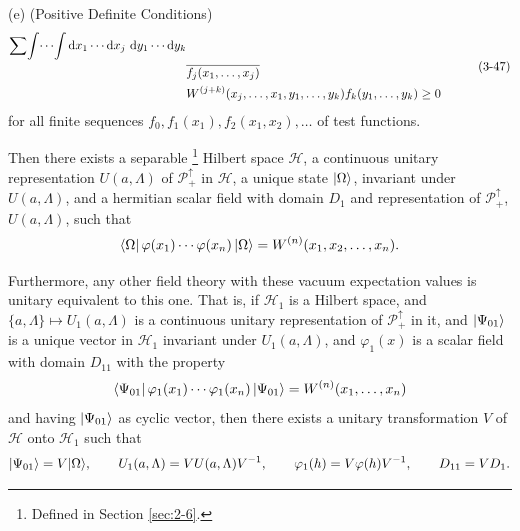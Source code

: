 \begin{theorem}[3-7]
\textup{(e) (Positive Definite Conditions)}
\begin{equation}
\begin{aligned}
\sum\!\int\!\cdots\!\int
 \mathop{}\!\mathrm{d} x_1\cdots\mathop{}\!\mathrm{d} x_j\,\mathop{}\!\mathrm{d} y_1\cdots\mathop{}\!\mathrm{d} y_k\\
 &\overline{f_j(x_1,\ldots,x_j)}\\
 &W^{(j+k)}(x_j,\ldots,x_1,y_1,\ldots,y_k)
 f_k(y_1,\ldots,y_k)\geq 0
\end{aligned}
\tag{3-47}\label{eq:ch3-reconstruction-positive}
\end{equation}
for all finite sequences \(f_0,f_1(x_1),f_2(x_1,x_2),\ldots\) of test
functions.

Then there exists a separable%
\footnote{Defined in Section \ref{sec:2-6}.}
 Hilbert space \(\mathcal H\), a continuous unitary representation
\(U(a,\Lambda)\) of \(\mathcal{P}_+^\uparrow\) in \(\mathcal H\), a unique
state \(\lvert \Omega\rangle\), invariant under \(U(a,\Lambda)\), and a hermitian
scalar field with domain \(D_1\) and representation of
\(\mathcal{P}_+^\uparrow\), \(U(a,\Lambda)\), such that
\begin{equation*}
\langle \Omega\rvert\,\varphi(x_1)\cdots\varphi(x_n)\,\lvert \Omega\rangle
 =W^{(n)}(x_1,x_2,\ldots,x_n) .
\end{equation*}

Furthermore, any other field theory with these vacuum expectation values is
unitary equivalent to this one.  That is, if \(\mathcal H_1\) is a Hilbert
space, and \(\{a,\Lambda\}\mapsto U_1(a,\Lambda)\) is a continuous unitary
representation of \(\mathcal{P}_+^\uparrow\) in it, and \(\lvert \Psi_{01}\rangle\) is a
unique vector in \(\mathcal H_1\) invariant under \(U_1(a,\Lambda)\), and
\(\varphi_1(x)\) is a scalar field with domain \(D_{11}\) with the property
\begin{equation*}
\langle \Psi_{01}\rvert\,\varphi_1(x_1)\cdots\varphi_1(x_n)\,\lvert \Psi_{01}\rangle
 =W^{(n)}(x_1,\ldots,x_n)
\end{equation*}
and having \(\lvert \Psi_{01}\rangle\) as cyclic vector, then there exists a unitary
transformation \(V\) of \(\mathcal H\) onto \(\mathcal H_1\) such that
\begin{equation*}
\lvert \Psi_{01}\rangle=V\lvert \Omega\rangle,\qquad
U_1(a,\Lambda)=VU(a,\Lambda)V^{-1},\qquad
\varphi_1(h)=V\varphi(h)V^{-1},\qquad D_{11}=VD_1 .
\end{equation*}
\end{theorem}

